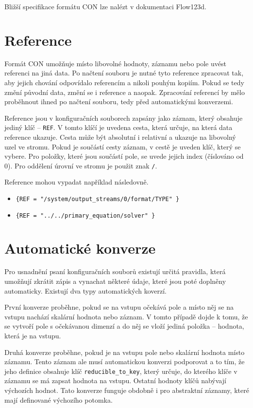 \documentclass[FM,MP]{tulthesis}
\begin{document}
	Bližší specifikace formátu CON lze nalézt v dokumentaci Flow123d. %


	\section{Reference}
		\label{reference}
		Formát CON umožňuje místo libovolné hodnoty, záznamu nebo pole uvést referenci na jiná data. Po načtení souboru je nutné tyto reference zpracovat tak, aby jejich chování odpovídalo referencím a nikoli pouhým kopiím. Pokud se tedy změní původní data, změní se i reference a naopak. Zpracování referencí by mělo proběhnout ihned po načtení souboru, tedy před automatickými konverzemi. 

		Reference jsou v konfiguračních souborech zapsány jako záznam, který obsahuje jediný klíč -- \texttt{REF}. V tomto klíčí je uvedena cesta, která určuje, na která data reference ukazuje. Cesta může být absolutní i relativní a ukazuje na libovolný uzel ve stromu. Pokud je součástí cesty záznam, v cestě je uveden klíč, který se vybere. Pro položky, které jsou součástí pole, se uvede jejich index (číslováno od 0). Pro oddělení úrovní ve stromu je použit znak \texttt{/}. 

		Reference mohou vypadat například následovně.
			\begin{itemize}
				\item \texttt{\{REF = "/system/output\_streams/0/format/TYPE" \}}
				\item \texttt{\{REF = "../../primary\_equation/solver" \}}
			\end{itemize}


	\section{Automatické konverze}
		\label{automaticke-konverze}
		Pro usnadnění psaní konfiguračních souborů existují určitá pravidla, která umožňují zkrátit zápis a vynachat některé údaje, které jsou poté doplněny automaticky. Existují dva typy automatických koverzí.

		První konverze proběhne, pokud se na vstupu očekává pole a místo něj se na vstupu nachází skalární hodnota nebo záznam. V tomto případě dojde k tomu, že se vytvoří pole s očekávanou dimenzí a do něj se vloží jediná položka -- hodnota, která je na vstupu.

		Druhá konverze proběhne, pokud je na vstupu pole nebo skalární hodnota místo záznamu. Tento záznam ale musí automatickou konverzi podporovat a to tím, že jeho definice obsahuje klíč \texttt{reducible\_to\_key}, který určuje, do kterého klíče v záznamu se má zapsat hodnota na vstupu. Ostatní hodnoty klíčů nabývají výchozích hodnot. Tato konverze funguje obdobně i pro abstraktní záznamy, které mají definované výchozího potomka. 
\end{document}
